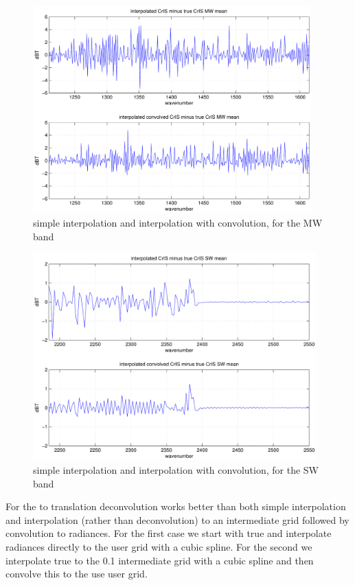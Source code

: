 \documentclass[12pt]{article}
\begin{document}
\begin{figure}
  \centering
  \includegraphics[height=8cm]{figures/airs_cris_intp_MW.pdf}
  \caption{simple interpolation and interpolation with convolution, 
    for the {\cris} MW band}
  \label{intpMW}
\end{figure}

\begin{figure}
  \centering
  \includegraphics[height=8cm]{figures/airs_cris_intp_SW.pdf}
  \caption{simple interpolation and interpolation with convolution, 
    for the {\cris} SW band}
  \label{intpSW}
\end{figure}

For the {\airs} to {\cris} translation deconvolution works better
than both simple interpolation and interpolation (rather than
deconvolution) to an intermediate grid followed by convolution to
{\cris} radiances.  For the first case we start with true {\airs} and
interpolate radiances directly to the {\cris} user grid with a cubic
spline.  For the second we interpolate true {\airs} to the 0.1 {\wn}
intermediate grid with a cubic spline and then convolve this to the
use {\cris} user grid.
\end{document}
